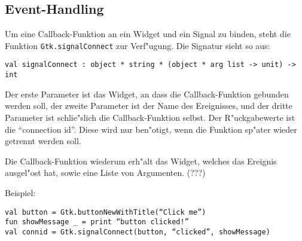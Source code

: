 \documentclass{article}
\begin{document}
\subsection{Event-Handling}

Um eine Callback-Funktion an ein Widget und ein Signal zu binden, steht die
Funktion \texttt{Gtk.signalConnect} zur Verf"ugung. Die Signatur sieht so aus:

\texttt
{val signalConnect : object * string * (object * arg list -> unit) -> int}

Der erste Parameter ist das Widget, an dass die Callback-Funktion gebunden
werden soll, der zweite Parameter ist der Name des Ereignisses, und der
dritte Parameter ist schlie"slich die Callback-Funktion selbst.
Der R"uckgabewerte ist die ``connection id''. Diese wird nur ben"otigt, wenn
die Funktion sp"ater wieder getrennt werden soll.

Die Callback-Funktion wiederum erh"alt das Widget, welches das Ereignis
ausgel"ost hat, sowie eine Liste von Argumenten. (???) 

Beispiel:

\texttt{val button = Gtk.buttonNewWithTitle(``Click me'')\\
        fun showMessage \_ = print ``button clicked!''\\
        val connid = Gtk.signalConnect(button, ``clicked'', showMessage)}
\end{document}
